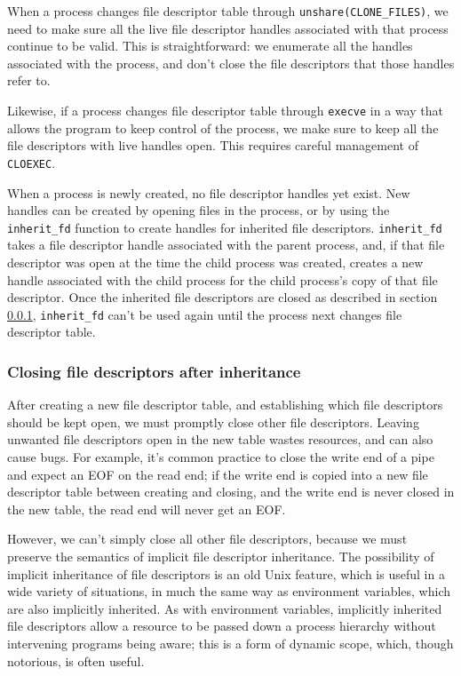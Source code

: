 \documentclass[letterpaper,twocolumn,10pt]{article}
\begin{document}
When a process changes file descriptor table through \verb|unshare(CLONE_FILES)|,
we need to make sure all the live file descriptor handles associated with that process continue to be valid.
This is straightforward:
we enumerate all the handles associated with the process,
and don't close the file descriptors that those handles refer to.

Likewise, if a process changes file descriptor table through \texttt{execve}
in a way that allows the program to keep control of the process,
we make sure to keep all the file descriptors with live handles open.
This requires careful management of \texttt{CLOEXEC}.

When a process is newly created,
no file descriptor handles yet exist.
New handles can be created by opening files in the process,
or by using the \verb|inherit_fd| function to create handles for inherited file descriptors.
\verb|inherit_fd| takes a file descriptor handle associated with the parent process,
and, if that file descriptor was open at the time the child process was created,
creates a new handle associated with the child process
for the child process's copy of that file descriptor.
Once the inherited file descriptors are closed as described in section \ref{cloexec},
\verb|inherit_fd| can't be used again until the process next changes file descriptor table.
\subsubsection{Closing file descriptors after inheritance}\label{cloexec}
After creating a new file descriptor table,
and establishing which file descriptors should be kept open,
we must promptly close other file descriptors.
Leaving unwanted file descriptors open in the new table wastes resources,
and can also cause bugs.
For example, it's common practice to close the write end of a pipe
and expect an EOF on the read end;
if the write end is copied into a new file descriptor table between creating and closing,
and the write end is never closed in the new table,
the read end will never get an EOF.

However, we can't simply close all other file descriptors,
because we must preserve the semantics of implicit file descriptor inheritance.
The possibility of implicit inheritance of file descriptors is an old Unix feature,
which is useful in a wide variety of situations,
in much the same way as environment variables, which are also implicitly inherited.
As with environment variables,
implicitly inherited file descriptors allow a resource to be passed down a process hierarchy
without intervening programs being aware;
this is a form of dynamic scope, which, though notorious, is often useful.
\end{document}
